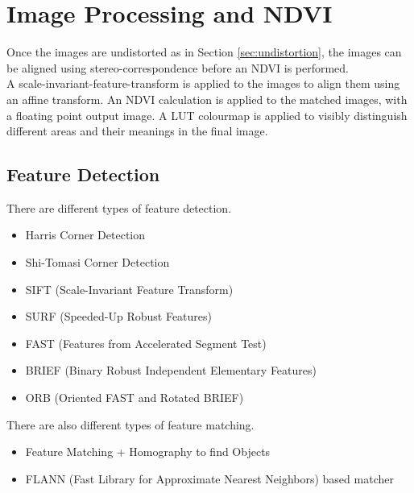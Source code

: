 \chapter{Image Processing and NDVI}
\label{sec:image_processing}

Once the images are undistorted as in Section \ref{sec:undistortion}, the images can be aligned using stereo-correspondence before an NDVI is performed.\\

A scale-invariant-feature-transform is applied to the images to align them using an affine transform. An NDVI calculation is applied to the matched images, with a floating point output image. A LUT colourmap is applied to visibly distinguish different areas and their meanings in the final image.

\section{Feature Detection}

There are different types of feature detection. 
\begin{itemize}
	\item Harris Corner Detection
	\item Shi-Tomasi Corner Detection
	\item SIFT (Scale-Invariant Feature Transform)
	\item SURF (Speeded-Up Robust Features)
	\item FAST (Features from Accelerated Segment Test)
	\item BRIEF (Binary Robust Independent Elementary Features)
	\item ORB (Oriented FAST and Rotated BRIEF)
\end{itemize}

There are also different types of feature matching.

\begin{itemize}
	\item Feature Matching + Homography to find Objects
	\item FLANN (Fast Library for Approximate Nearest Neighbors) based matcher
\end{itemize}

